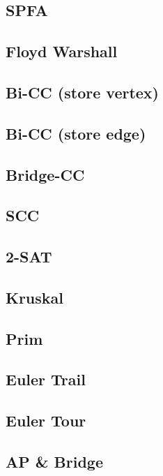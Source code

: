 \subsection{SPFA}

\subsection{Floyd Warshall}

\subsection{Bi-CC (store vertex)}

\subsection{Bi-CC (store edge)}

\subsection{Bridge-CC}

\subsection{SCC}

\subsection{2-SAT}

\subsection{Kruskal}

\subsection{Prim}

\subsection{Euler Trail}

\subsection{Euler Tour}

\subsection{AP \& Bridge}

